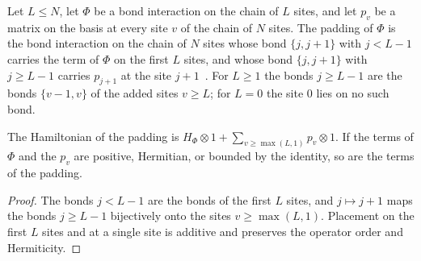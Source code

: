 \begin{definition}
    \label{def:hamiltonians_bond_padded}
    \leanok
    Let $L\le N$, let $\Phi$ be a bond interaction on the chain of $L$ sites, and
    let $p_v$ be a matrix on the basis at every site $v$ of the chain of $N$ sites. The
    padding of $\Phi$ is the bond interaction on the chain of $N$ sites whose bond
    $\{j,j+1\}$ with $j<L-1$ carries the term of $\Phi$ on the first $L$ sites, and whose
    bond $\{j,j+1\}$ with $j\ge L-1$ carries $p_{j+1}$ at the site
    $j+1$~\cite[lines 652--678]{Landau2013PolynomialTime}. For $L\ge1$ the bonds $j\ge L-1$
    are the bonds $\{v-1,v\}$ of the added sites $v\ge L$; for $L=0$ the site $0$ lies on
    no such bond.
\end{definition}

\begin{lemma}
    \label{lem:hamiltonians_bond_padded}
    \leanok
    The Hamiltonian of the padding is
    $H_\Phi\otimes1+\sum_{v\ge\max(L,1)}p_v\otimes1$. If the terms of $\Phi$ and the $p_v$
    are positive, Hermitian, or bounded by the identity, so are the terms of the padding.
\end{lemma}
\begin{proof}\leanok
    The bonds $j<L-1$ are the bonds of the first $L$ sites, and $j\mapsto j+1$ maps the
    bonds $j\ge L-1$ bijectively onto the sites $v\ge\max(L,1)$. Placement on the first
    $L$ sites and at a single site is additive and preserves the operator order and
    Hermiticity.
\end{proof}


